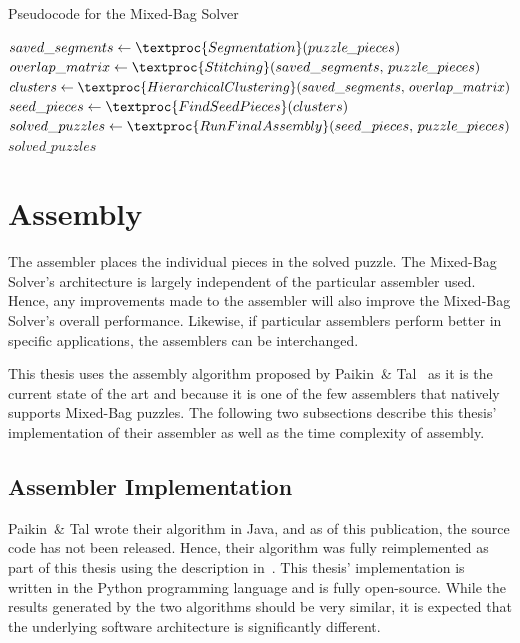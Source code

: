 \begin{algorithm}[t]
\caption{Pseudocode for the Mixed-Bag Solver}\label{alg:mixedBagSolver}
\begin{algorithmic}[1]
    \State $saved\_segments \gets \textproc{Segmentation}\text{(} puzzle\hspace{-0.8pt}\_pieces \text{)}$
	\State $overlap\_matrix \gets \textproc{Stitching}\text{(} saved\_segments \text{, } puzzle\hspace{-0.8pt}\_pieces \text{)}$
	\State $clusters \gets \textproc{HierarchicalClustering} \text{(}saved\_segments \text{, } overlap\_matrix \text{)}$
	\State $seed\_pieces \gets \textproc{FindSeedPieces} \text{(} clusters \text{)}$
	\State $solved\_puzzles \gets \textproc{RunFinalAssembly} \text{(} seed\_pieces \text{, } puzzle\hspace{-0.8pt}\_pieces \text{)}$
    \State \Return $solved\_puzzles$
\EndFunction
\end{algorithmic}
\end{algorithm}

\section{Assembly}\label{sec:SolverAssembler}

The assembler places the individual pieces in the solved puzzle.  The Mixed-Bag Solver's architecture is largely independent of the particular assembler used.  Hence, any improvements made to the assembler will also improve the Mixed-Bag Solver's overall performance.  Likewise, if particular assemblers perform better in specific applications, the assemblers can be interchanged.  

This thesis uses the assembly algorithm proposed by Paikin~\& Tal~\cite{paikin2015} as it is the current state of the art and because it is one of the few assemblers that natively supports Mixed-Bag puzzles.  The following two subsections describe this thesis' implementation of their assembler as well as the time complexity of assembly.

\subsection{Assembler Implementation}\label{sec:assemblerImplementation}

Paikin~\& Tal wrote their algorithm in Java, and as of this publication, the source code has not been released.  Hence, their algorithm was fully reimplemented as part of this thesis using the description in~\cite{paikin2015}.  This thesis' implementation is written in the Python programming language and is fully open-source. While the results generated by the two algorithms should be very similar, it is expected that the underlying software architecture is significantly different. 


